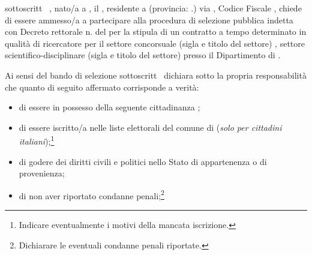 \documentclass[a4paper,10pt]{article}
\begin{document}
\begin{Form}
 
 
\myTextField[.5cm]{} sottoscritt~\myTextField[.5cm]{} \myTextField[4cm]{}, 
nato/a a \myTextField{}, il \myTextField{}, residente a \myTextField{} 
(provincia: \myTextField{}.) via \myTextField{}, Codice Fiscale 
\myTextField[4cm]{}, chiede di essere ammesso/a a partecipare alla procedura 
di selezione pubblica indetta con Decreto rettorale n. \myTextField{} del 
\myTextField{} per la stipula di un contratto a tempo determinato in qualità 
di ricercatore per il settore concorsuale (sigla e titolo del settore) \myTextField{}, 
settore scientifico-disciplinare (sigla e titolo  del settore) \myTextField{} 
presso il Dipartimento di \myTextField[4cm]{}.

Ai sensi del bando di selezione  \myTextField[.5cm]{} sottoscritt~\myTextField[.5cm]{} 
dichiara sotto la propria responsabilità che quanto di seguito affermato 
corrisponde a verità:
\begin{itemize}
 \item di essere in possesso della seguente cittadinanza \myTextField{};
\item di essere iscritto/a nelle liste elettorali del comune di \myTextField{} 
(\emph{solo per cittadini italiani});\footnote{Indicare eventualmente i motivi 
della mancata iscrizione.}

\myTextField[.9\textwidth]{}
\item di godere dei diritti civili e politici nello Stato di appartenenza o di 
provenienza;
\item di non aver riportato condanne penali;\footnote{Dichiarare le eventuali 
condanne penali riportate.}


\end{itemize}
\end{Form}
\end{document}
